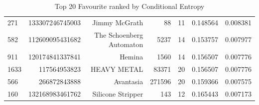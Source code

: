 \begin{table}
\begin{tabular}{| >{\small}l | >{\small}r | >{\small}r | >{\small}r | >{\small}r | >{\small}r |>{\small}r |}
271  &  133307246745003 &             Jimmy McGrath &      88 &       11 &             0.148564 &            0.008381 \\
582  &  112609095431682 &  The Schoenberg Automaton &    5237 &       14 &             0.153757 &            0.007977 \\
911  &  120174841337841 &                    Hemina &    1560 &       14 &             0.156507 &            0.007776 \\
1633 &     117564953823 &               HEAVY METAL &   83371 &       20 &             0.156507 &            0.007776 \\
566  &     266872843888 &                 Avantasia &  271596 &       20 &             0.159366 &            0.007575 \\
160  &  132168983461762 &         Silicone Stripper &     143 &       12 &             0.165443 &            0.007173 \\
\hline
\end{tabular}
\caption{Top 20 Favourite ranked by Conditional Entropy}
\label {Top 20 Favourite ranked by Conditional Entropy}
\end{table}
	